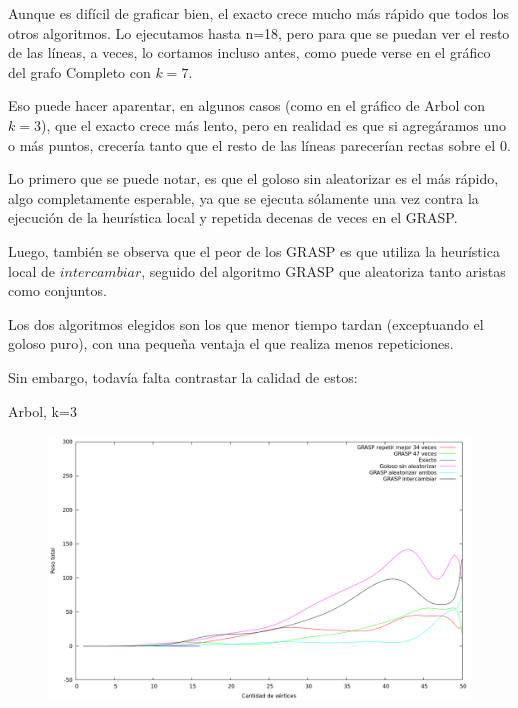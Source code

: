 \vspace*{0.5cm}

Aunque es difícil de graficar bien, el exacto crece mucho más rápido que todos
los otros algoritmos.
Lo ejecutamos hasta n=18, pero para que se puedan ver el resto de las líneas,
a veces, lo cortamos incluso antes, como puede verse en el gráfico del grafo
Completo con $k = 7$.

Eso puede hacer aparentar, en algunos casos (como en el gráfico de Arbol con
$k = 3$), que el exacto crece más lento, pero en realidad es que si agregáramos
uno o más puntos, crecería tanto que el resto de las líneas parecerían rectas
sobre el 0.

Lo primero que se puede notar, es que el goloso sin aleatorizar es el más
rápido, algo completamente esperable, ya que se ejecuta sólamente una vez contra
la ejecución de la heurística local y repetida decenas de veces en el GRASP.

Luego, también se observa que el peor de los GRASP es que utiliza la heurística
local de $intercambiar$, seguido del algoritmo GRASP que aleatoriza tanto
aristas como conjuntos.

Los dos algoritmos elegidos son los que menor tiempo tardan (exceptuando el
goloso puro), con una pequeña ventaja el que realiza menos repeticiones.

Sin embargo, todavía falta contrastar la calidad de estos:

Arbol, k=3
\vspace*{0.5cm}

\begin{figure}[H]
  \begin{center}
    \includegraphics[scale=0.35]{imagenes/ej6-arbol-k3-peso.png}
  \end{center}
\end{figure}

